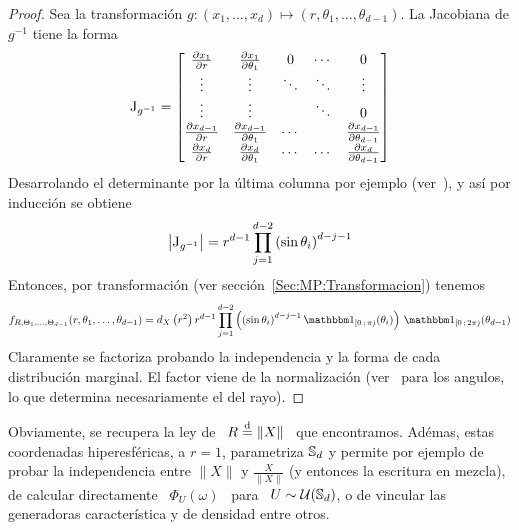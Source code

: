 \begin{proof}
  Sea      la       transformaci\'on      $g:      (x_1,\ldots,x_d)      \mapsto
  (r,\theta_1,\ldots,\theta_{d-1})$. La Jacobiana de $g^{-1}$ tiene la forma
  \[
  \operatorname{J}_{g^{-1}} = \begin{bmatrix}
    \frac{\partial x_1}{\partial r} & \frac{\partial x_1}{\partial \theta_1} & 0 & \cdots & 0\\
    \vdots & \vdots & \ddots & \ddots & \vdots\\
    \vdots & \vdots &  & \ddots  & 0\\
    \frac{\partial x_{d-1}}{\partial r} & \frac{\partial x_{d-1}}{\partial
    \theta_1} & \cdots & & \frac{\partial x_{d-1}}{\partial \theta_{d-1}}\\
    \frac{\partial x_d}{\partial  r} & \frac{\partial  x_d}{\partial \theta_1} &
    \cdots & \cdots & \frac{\partial x_d}{\partial \theta_{d-1}}
  \end{bmatrix}
  \]
  Desarrolando   el   determinante  por   la   \'ultima   columna  por   ejemplo
  (ver~\cite{Bha97, HorJoh13}), y as\'i por inducci\'on se obtiene
  \[
  \left|   \operatorname{J}_{g^{-1}}  \right|  =   r^{d-1}  \prod_{j=1}^{d-2}   \left(  \sin
    \theta_i\right)^{d-j-1}
  \]
  Entonces,  por  transformaci\'on  (ver  secci\'on~\ref{Sec:MP:Transformacion})
  tenemos
  \[
  f_{R,\Theta_1,\ldots,\Theta_{d-1}}(r,\theta_1,\ldots,\theta_{d-1}) = d_X\left(
    r^2    \right)     r^{d-1}    \prod_{j=1}^{d-2}    \left(     \left(    \sin
      \theta_i\right)^{d-j-1} \un_{[0 \; \pi)}(\theta_i) \right) \, \un_{[0 \; 2
    \pi)}(\theta_{d-1})
  \]
  Claramente  se  factoriza  probando  la  independencia  y  la  forma  de  cada
  distribuci\'on   marginal.    El   factor   viene    de   la   normalizaci\'on
  (ver~\cite[Ec.~8.380-2]{GraRyz15}   para  los   angulos,   lo  que   determina
  necesariamente el del rayo).
\end{proof}
%
Obviamente,  se  recupera la  ley  de  \ $R  \stackrel{\mathrm{d}}{=}  \|X\|$  \ que  encontramos.
Ad\'emas, estas  coordenadas hiperesf\'ericas, a $r=1$,  parametriza $\mathbb{S}_d$ y
permite por ejemplo de probar la independencia entre $\|X\|$ y $\frac{X}{\|X\|}$
(y entonces la escritura en mezcla), de calcular directamente \ $\Phi_U(\omega)$
\ para \ $U \sim \mathcal{U}(\mathbb{S}_d)$,  o de vincular las generadoras caracter\'istica y
de densidad entre otros.

